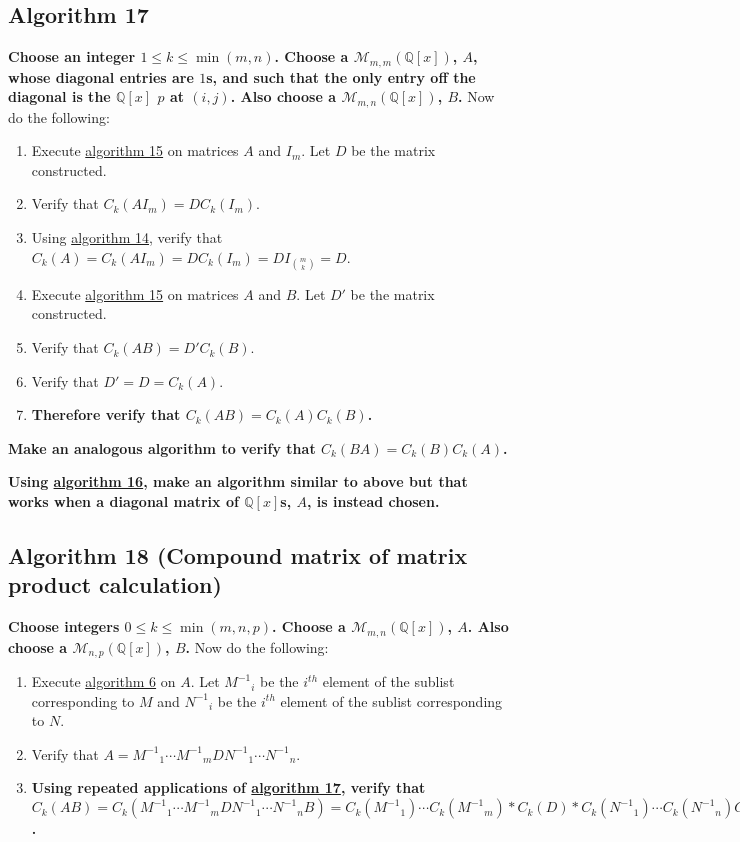 \documentclass[twocolumn]{article}
\begin{document}
		\subsection{Algorithm 17}\label{sec:algorithm 17}
			\textbf{Choose an integer $1\le k\le\min(m,n)$. Choose a $\mathcal{M}_{m,m}(\mathbb{Q}[x])$, $A$, whose diagonal entries are $1$s, and such that the only entry off the diagonal is the $\mathbb{Q}[x]$ $p$ at $(i,j)$. Also choose a $\mathcal{M}_{m,n}(\mathbb{Q}[x])$, $B$.} Now do the following:
			\begin{enumerate}
				\item Execute \hyperref[sec:algorithm 15]{algorithm 15} on matrices $A$ and $I_m$. Let $D$ be the matrix constructed.
				\item Verify that $C_k(AI_m)=DC_k(I_m)$.
				\item Using \hyperref[sec:algorithm 14]{algorithm 14}, verify that $C_k(A)=C_k(AI_m)=DC_k(I_m)=DI_{\binom{m}{k}}=D$.
				\item Execute \hyperref[sec:algorithm 15]{algorithm 15} on matrices $A$ and $B$. Let $D'$ be the matrix constructed.
				\item Verify that $C_k(AB)=D'C_k(B)$.
				\item Verify that $D'=D=C_k(A)$.
				\item \textbf{Therefore verify that $C_k(AB)=C_k(A)C_k(B)$.}
			\end{enumerate}
			\textbf{Make an analogous algorithm to verify that $C_k(BA)=C_k(B)C_k(A)$.}
			
			\textbf{Using \hyperref[sec:algorithm 16]{algorithm 16}, make an algorithm similar to above but that works when a diagonal matrix of $\mathbb{Q}[x]$s, $A$, is instead chosen.}
		\subsection{Algorithm 18 (Compound matrix of matrix product calculation)}\label{sec:algorithm 18}
			\textbf{Choose integers $0\le k\le\min(m,n,p)$. Choose a $\mathcal{M}_{m,n}(\mathbb{Q}[x])$, $A$. Also choose a $\mathcal{M}_{n,p}(\mathbb{Q}[x])$, $B$.} Now do the following:
			\begin{enumerate}
				\item Execute \hyperref[sec:algorithm 6]{algorithm 6} on $A$. Let ${M^{-1}}_i$ be the $i^{th}$ element of the sublist corresponding to $M$ and ${N^{-1}}_i$ be the $i^{th}$ element of the sublist corresponding to $N$.
				\item Verify that $A={M^{-1}}_1\cdots {M^{-1}}_mD{N^{-1}}_1\cdots {N^{-1}}_n$.
				\item \textbf{Using repeated applications of \hyperref[sec:algorithm 17]{algorithm 17}, verify that $C_k(AB)=C_k({M^{-1}}_1\cdots {M^{-1}}_mD{N^{-1}}_1\cdots {N^{-1}}_nB)=C_k({M^{-1}}_1)\cdots C_k({M^{-1}}_m)*C_k(D)*C_k({N^{-1}}_1)\cdots C_k({N^{-1}}_n)C_k(B)=C_k({M^{-1}}_1\cdots {M^{-1}}_mD{N^{-1}}_1\cdots {N^{-1}}_n)C_k(B)=C_k(A)C_k(B)$.}
			\end{enumerate}
\end{document}
